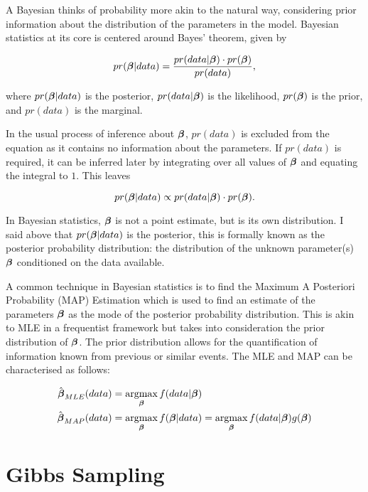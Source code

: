 \begin{appendices}
A Bayesian thinks of probability more akin to the natural way, considering prior information about the distribution of the parameters in the model. Bayesian statistics at its core is centered around Bayes' theorem, given by

\begin{equation}\label{bayes-theorem}
    pr(\boldsymbol{\beta}|data)=\frac{pr(data|\boldsymbol{\beta})\cdot pr(\boldsymbol{\beta})}{pr(data)},
\end{equation}

where $pr(\boldsymbol{\beta}|data)$ is the posterior, $pr(data|\boldsymbol{\beta})$ is the likelihood, $pr(\boldsymbol{\beta})$ is the prior, and $pr(data)$ is the marginal. 

In the usual process of inference about $\boldsymbol{\beta}$, $pr(data)$ is excluded from the equation as it contains no information about the parameters. If $pr(data)$ is required, it can be inferred later by integrating over all values of $\boldsymbol{\beta}$ and equating the integral to $1$. This leaves

\begin{equation}
    pr(\boldsymbol{\beta}|data)\propto pr(data|\boldsymbol{\beta})\cdot pr(\boldsymbol{\beta}).
\end{equation}

In Bayesian statistics, $\boldsymbol{\beta}$ is not a point estimate, but is its own distribution. I said above that $pr(\boldsymbol{\beta}|data)$ is the posterior, this is formally known as the posterior probability distribution: the distribution of the unknown parameter(s) $\boldsymbol{\beta}$ conditioned on the data available. 

A common technique in Bayesian statistics is to find the Maximum A Posteriori Probability (MAP) Estimation which is used to find an estimate of the parameters $\boldsymbol{\beta}$ as the mode of the posterior probability distribution. This is akin to MLE in a frequentist framework but takes into consideration the prior distribution of $\boldsymbol{\beta}$. The prior distribution allows for the quantification of information known from previous or similar events. The MLE and MAP can be characterised as follows:

\begin{align}
    \hat{\boldsymbol{\beta}}_{MLE}(data) &= \operatorname*{argmax}_{\boldsymbol{\beta}} f(data|\boldsymbol{\beta})\label{mle}\\
    \hat{\boldsymbol{\beta}}_{MAP}(data) &= \operatorname*{argmax}_{\boldsymbol{\beta}} f(\boldsymbol{\beta}|data) = \operatorname*{argmax}_{\boldsymbol{\beta}} f(data|\boldsymbol{\beta})g(\boldsymbol{\beta})\label{map}
\end{align}

\section{Gibbs Sampling}


\end{appendices}
